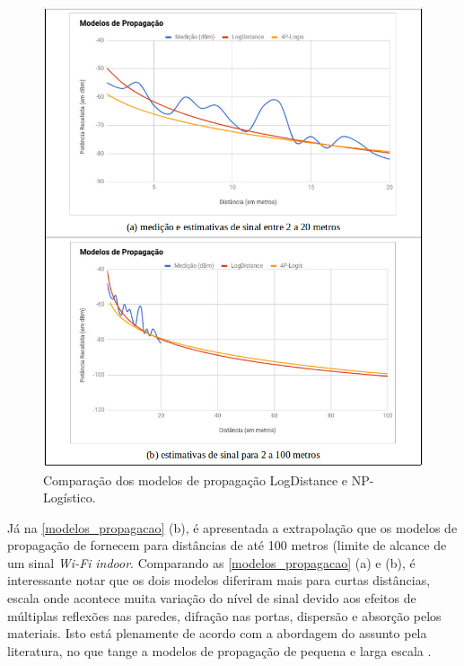 \documentclass[
	12pt,				%
	twoside,			%
	a4paper,			%
	english,			%
	french,				%
	spanish,			%
	brazil				%
	]{abntex2}
\begin{document}
\begin{figure}[htb]
    \caption{\label{modelos_propagacao} Comparação dos modelos de propagação LogDistance e NP-Logístico.}
    \begin{center}
        \includegraphics[scale=0.6]{imagens/modelos-propagacao.jpg}
    \end{center}
\end{figure}

Já na \autoref{modelos_propagacao} (b), é apresentada a extrapolação que
os modelos de propagação de fornecem para distâncias de até 100 metros
(limite de alcance de um sinal \emph{Wi-Fi} \emph{indoor}. Comparando as
\autoref{modelos_propagacao} (a) e (b), é interessante notar que os dois
modelos diferiram mais para curtas distâncias, escala onde acontece
muita variação do nível de sinal devido aos efeitos de múltiplas
reflexões nas paredes, difração nas portas, dispersão e absorção pelos
materiais. Isto está plenamente de acordo com a abordagem do assunto
pela literatura, no que tange a modelos de propagação de pequena e larga
escala \cite{RAPPAPORT}.
\end{document}
